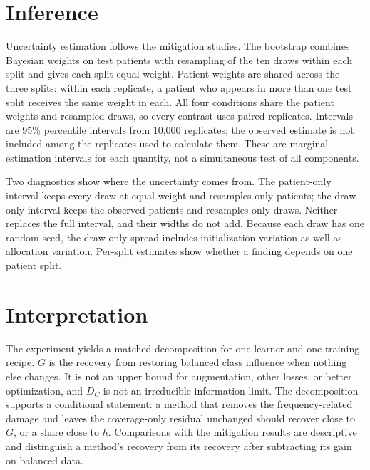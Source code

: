 \documentclass[11pt]{article}
\begin{document}
\section{Inference}
\label{sec:inference}
Uncertainty estimation follows the mitigation studies. The bootstrap combines Bayesian weights on test patients \citep{rubin1981bayesian} with resampling of the ten draws within each split and gives each split equal weight. Patient weights are shared across the three splits: within each replicate, a patient who appears in more than one test split receives the same weight in each. All four conditions share the patient weights and resampled draws, so every contrast uses paired replicates. Intervals are 95\% percentile intervals from 10,000 replicates; the observed estimate is not included among the replicates used to calculate them. These are marginal estimation intervals for each quantity, not a simultaneous test of all components.

Two diagnostics show where the uncertainty comes from. The patient-only interval keeps every draw at equal weight and resamples only patients; the draw-only interval keeps the observed patients and resamples only draws. Neither replaces the full interval, and their widths do not add. Because each draw has one random seed, the draw-only spread includes initialization variation as well as allocation variation. Per-split estimates show whether a finding depends on one patient split.

\section{Interpretation}
\label{sec:interpretation}
The experiment yields a matched decomposition for one learner and one training recipe. $G$ is the recovery from restoring balanced class influence when nothing else changes. It is not an upper bound for augmentation, other losses, or better optimization, and $D_C$ is not an irreducible information limit. The decomposition supports a conditional statement: a method that removes the frequency-related damage and leaves the coverage-only residual unchanged should recover close to $G$, or a share close to $h$. Comparisons with the mitigation results are descriptive and distinguish a method's recovery from its recovery after subtracting its gain on balanced data.

\end{document}
